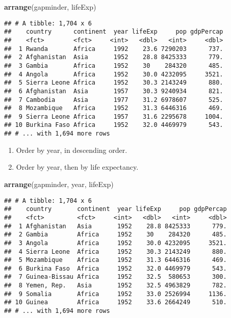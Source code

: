 \documentclass[]{article}
\newenvironment{Shaded}{\begin{snugshade}}{\end{snugshade}}
\newcommand{\KeywordTok}[1]{\textcolor[rgb]{0.13,0.29,0.53}{\textbf{{#1}}}}
\newcommand{\NormalTok}[1]{{#1}}
\begin{document}
\begin{Shaded}
\begin{Highlighting}[]
\KeywordTok{arrange}\NormalTok{(gapminder, lifeExp)}
\end{Highlighting}
\end{Shaded}

\begin{verbatim}
## # A tibble: 1,704 x 6
##    country      continent  year lifeExp     pop gdpPercap
##    <fct>        <fct>     <int>   <dbl>   <int>     <dbl>
##  1 Rwanda       Africa     1992    23.6 7290203      737.
##  2 Afghanistan  Asia       1952    28.8 8425333      779.
##  3 Gambia       Africa     1952    30    284320      485.
##  4 Angola       Africa     1952    30.0 4232095     3521.
##  5 Sierra Leone Africa     1952    30.3 2143249      880.
##  6 Afghanistan  Asia       1957    30.3 9240934      821.
##  7 Cambodia     Asia       1977    31.2 6978607      525.
##  8 Mozambique   Africa     1952    31.3 6446316      469.
##  9 Sierra Leone Africa     1957    31.6 2295678     1004.
## 10 Burkina Faso Africa     1952    32.0 4469979      543.
## # ... with 1,694 more rows
\end{verbatim}

\begin{enumerate}
\def\labelenumi{\arabic{enumi}.}
\setcounter{enumi}{1}
\item
  Order by year, in descending order.
\item
  Order by year, then by life expectancy.
\end{enumerate}

\begin{Shaded}
\begin{Highlighting}[]
\KeywordTok{arrange}\NormalTok{(gapminder, year, lifeExp)}
\end{Highlighting}
\end{Shaded}

\begin{verbatim}
## # A tibble: 1,704 x 6
##    country       continent  year lifeExp     pop gdpPercap
##    <fct>         <fct>     <int>   <dbl>   <int>     <dbl>
##  1 Afghanistan   Asia       1952    28.8 8425333      779.
##  2 Gambia        Africa     1952    30    284320      485.
##  3 Angola        Africa     1952    30.0 4232095     3521.
##  4 Sierra Leone  Africa     1952    30.3 2143249      880.
##  5 Mozambique    Africa     1952    31.3 6446316      469.
##  6 Burkina Faso  Africa     1952    32.0 4469979      543.
##  7 Guinea-Bissau Africa     1952    32.5  580653      300.
##  8 Yemen, Rep.   Asia       1952    32.5 4963829      782.
##  9 Somalia       Africa     1952    33.0 2526994     1136.
## 10 Guinea        Africa     1952    33.6 2664249      510.
## # ... with 1,694 more rows
\end{verbatim}
\end{document}
